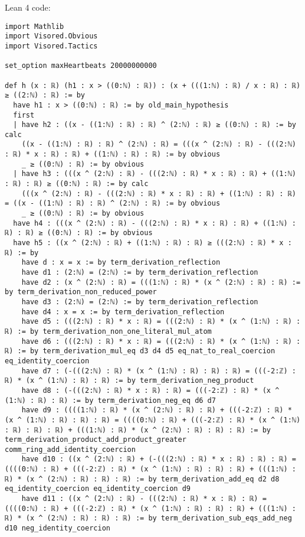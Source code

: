 \documentclass{article}
\begin{document}
Lean 4 code:
\begin{tcolorbox}[colback=white!10, width=\linewidth]
\begin{lstlisting}[language=Lean4]
import Mathlib
import Visored.Obvious
import Visored.Tactics

set_option maxHeartbeats 20000000000

def h (x : ℝ) (h1 : x > ((0:ℕ) : ℝ)) : (x + (((1:ℕ) : ℝ) / x : ℝ) : ℝ) ≥ ((2:ℕ) : ℝ) := by
  have h1 : x > ((0:ℕ) : ℝ) := by old_main_hypothesis
  first
  | have h2 : ((x - ((1:ℕ) : ℝ) : ℝ) ^ (2:ℕ) : ℝ) ≥ ((0:ℕ) : ℝ) := by calc
    ((x - ((1:ℕ) : ℝ) : ℝ) ^ (2:ℕ) : ℝ) = (((x ^ (2:ℕ) : ℝ) - (((2:ℕ) : ℝ) * x : ℝ) : ℝ) + ((1:ℕ) : ℝ) : ℝ) := by obvious
    _ ≥ ((0:ℕ) : ℝ) := by obvious
  | have h3 : (((x ^ (2:ℕ) : ℝ) - (((2:ℕ) : ℝ) * x : ℝ) : ℝ) + ((1:ℕ) : ℝ) : ℝ) ≥ ((0:ℕ) : ℝ) := by calc
    (((x ^ (2:ℕ) : ℝ) - (((2:ℕ) : ℝ) * x : ℝ) : ℝ) + ((1:ℕ) : ℝ) : ℝ) = ((x - ((1:ℕ) : ℝ) : ℝ) ^ (2:ℕ) : ℝ) := by obvious
    _ ≥ ((0:ℕ) : ℝ) := by obvious
  have h4 : (((x ^ (2:ℕ) : ℝ) - (((2:ℕ) : ℝ) * x : ℝ) : ℝ) + ((1:ℕ) : ℝ) : ℝ) ≥ ((0:ℕ) : ℝ) := by obvious
  have h5 : ((x ^ (2:ℕ) : ℝ) + ((1:ℕ) : ℝ) : ℝ) ≥ (((2:ℕ) : ℝ) * x : ℝ) := by
    have d : x = x := by term_derivation_reflection
    have d1 : (2:ℕ) = (2:ℕ) := by term_derivation_reflection
    have d2 : (x ^ (2:ℕ) : ℝ) = (((1:ℕ) : ℝ) * (x ^ (2:ℕ) : ℝ) : ℝ) := by term_derivation_non_reduced_power
    have d3 : (2:ℕ) = (2:ℕ) := by term_derivation_reflection
    have d4 : x = x := by term_derivation_reflection
    have d5 : (((2:ℕ) : ℝ) * x : ℝ) = (((2:ℕ) : ℝ) * (x ^ (1:ℕ) : ℝ) : ℝ) := by term_derivation_non_one_literal_mul_atom
    have d6 : (((2:ℕ) : ℝ) * x : ℝ) = (((2:ℕ) : ℝ) * (x ^ (1:ℕ) : ℝ) : ℝ) := by term_derivation_mul_eq d3 d4 d5 eq_nat_to_real_coercion eq_identity_coercion
    have d7 : (-(((2:ℕ) : ℝ) * (x ^ (1:ℕ) : ℝ) : ℝ) : ℝ) = (((-2:ℤ) : ℝ) * (x ^ (1:ℕ) : ℝ) : ℝ) := by term_derivation_neg_product
    have d8 : (-(((2:ℕ) : ℝ) * x : ℝ) : ℝ) = (((-2:ℤ) : ℝ) * (x ^ (1:ℕ) : ℝ) : ℝ) := by term_derivation_neg_eq d6 d7
    have d9 : ((((1:ℕ) : ℝ) * (x ^ (2:ℕ) : ℝ) : ℝ) + (((-2:ℤ) : ℝ) * (x ^ (1:ℕ) : ℝ) : ℝ) : ℝ) = ((((0:ℕ) : ℝ) + (((-2:ℤ) : ℝ) * (x ^ (1:ℕ) : ℝ) : ℝ) : ℝ) + (((1:ℕ) : ℝ) * (x ^ (2:ℕ) : ℝ) : ℝ) : ℝ) := by term_derivation_product_add_product_greater comm_ring_add_identity_coercion
    have d10 : ((x ^ (2:ℕ) : ℝ) + (-(((2:ℕ) : ℝ) * x : ℝ) : ℝ) : ℝ) = ((((0:ℕ) : ℝ) + (((-2:ℤ) : ℝ) * (x ^ (1:ℕ) : ℝ) : ℝ) : ℝ) + (((1:ℕ) : ℝ) * (x ^ (2:ℕ) : ℝ) : ℝ) : ℝ) := by term_derivation_add_eq d2 d8 eq_identity_coercion eq_identity_coercion d9
    have d11 : ((x ^ (2:ℕ) : ℝ) - (((2:ℕ) : ℝ) * x : ℝ) : ℝ) = ((((0:ℕ) : ℝ) + (((-2:ℤ) : ℝ) * (x ^ (1:ℕ) : ℝ) : ℝ) : ℝ) + (((1:ℕ) : ℝ) * (x ^ (2:ℕ) : ℝ) : ℝ) : ℝ) := by term_derivation_sub_eqs_add_neg d10 neg_identity_coercion

\end{lstlisting}
\end{tcolorbox}
\end{document}
